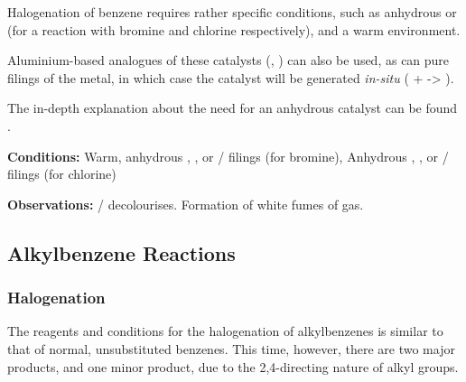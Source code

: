 			Halogenation of benzene requires rather specific conditions, such as anhydrous  or  (for a reaction
			with bromine and chlorine respectively), and a warm environment.

			Aluminium-based analogues of these catalysts (, ) can also be used, as can pure
			filings of the metal, in which case the catalyst will be generated \textit{in-situ} ( +  -> ).

			The in-depth explanation about the need for an anhydrous catalyst can be found \hyperlink{BenzeneHalogenationCatalyst}{}.

			\vspace{1.5em}
			\vbox{\textbf{Conditions:}	\tabto{35mm}Warm, anhydrous , , or  / \ch{\Al} filings (for bromine),
										\tabto{35mm}Anhydrous , , or
													 / \ch{\Al} filings (for chlorine)}

			\vspace{0.75em}
			\vbox{\textbf{Observations:}\tabto{35mm}  /   decolourises.
										\tabto{35mm}Formation of white fumes of  gas.}



		\pagebreak
		\subsection{Alkylbenzene Reactions}

			\subsubsection{Halogenation}
				The reagents and conditions for the halogenation of alkylbenzenes is similar to that of normal, unsubstituted benzenes. This
				time, however, there are two major products, and one minor product, due to the 2,4-directing nature of alkyl groups.

